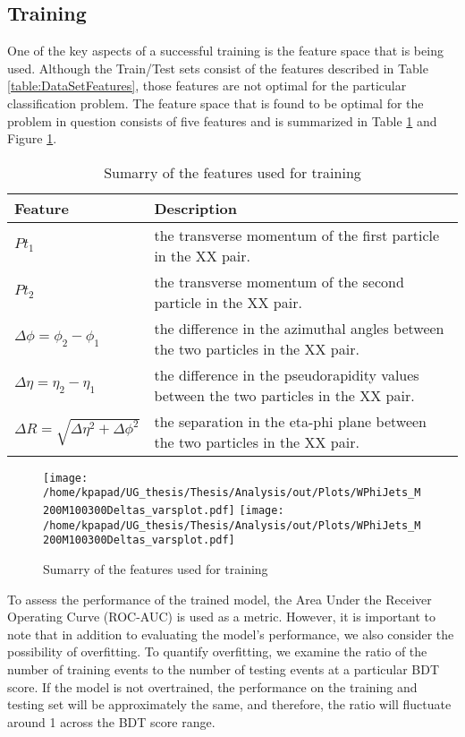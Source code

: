\subsection{Training}
\label{sec:org02a9777}
\label{sec:Training}
One of the key aspects of a successful training is the feature space that is being used. Although the Train/Test sets consist of the features described in Table \ref{table:DataSetFeatures}, those features are not optimal for the particular classification problem. The feature space that is found to be optimal for the problem in question consists of five features and is summarized in Table \ref{table:TrainFeatures} and Figure \ref{fig:TrainFeaturesPlot}.

\begin{table}[h!]
\centering
\begin{tabular}{ |p{3.5cm}|p{11cm}| }
 \hline
Feature & Description \\
 \hline
$Pt_{1}$ &  the transverse momentum of the first particle in the XX pair. \\
 \hline
$Pt_{2}$ &the transverse momentum of the second particle in the XX pair. \\
 \hline
$\Delta\phi = \phi_{2} - \phi_{1}$ & the difference in the azimuthal angles between the two particles in the XX pair. \\
 \hline
$\Delta\eta = \eta_{2} - \eta_{1}$ & the difference in the pseudorapidity values between the two particles in the XX pair. \\
 \hline
$\Delta R = \sqrt{\Delta\eta^{2} + \Delta\phi^{2}}$ & the separation in the eta-phi plane between the two particles in the XX pair. \\
 \hline
\end{tabular}
\caption{Sumarry of the features used for training }
\label{table:TrainFeatures}
\end{table}

\begin{figure}[h!]
\centering
\texttt{[image: /home/kpapad/UG\_thesis/Thesis/Analysis/out/Plots/WPhiJets\_M200M100300Deltas\_varsplot.pdf]}
\texttt{[image: /home/kpapad/UG\_thesis/Thesis/Analysis/out/Plots/WPhiJets\_M200M100300Deltas\_varsplot.pdf]}
\caption{Sumarry of the features used for training }
\label{fig:TrainFeaturesPlot}
\end{figure}

To assess the performance of the trained model, the Area Under the Receiver Operating Curve (ROC-AUC) is used as a metric. However, it is important to note that in addition to evaluating the model's performance, we also consider the possibility of overfitting. To quantify overfitting, we examine the ratio of the number of training events to the number of testing events at a particular BDT score. If the model is not overtrained, the performance on the training and testing set will be approximately the same, and therefore, the ratio will fluctuate around 1 across the BDT score range.


